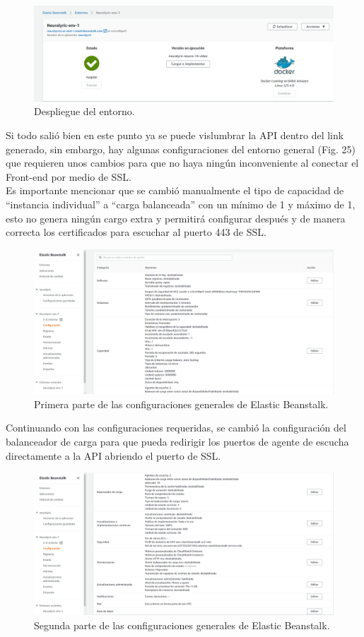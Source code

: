 \documentclass[12pt, a4paper, titlepage]{article}
\begin{document}
		\begin{figure}[H]
			\includegraphics[width=12cm]{./Imagenes/BackEnd/paso_5.png}
			\centering 
			\caption{Despliegue del entorno.}
		\end{figure}
		Si todo salió bien en este punto ya se puede vislumbrar la API dentro del link generado, sin embargo, hay algunas configuraciones del entorno general (Fig. 25) que requieren unos cambios para que no haya ningún inconveniente al conectar el Front-end por medio de SSL.\\
		Es importante mencionar que se cambió manualmente el tipo de capacidad de “instancia individual” a “carga balanceada” con un mínimo de 1 y máximo de 1, esto no genera ningún cargo extra y permitirá configurar después y de manera correcta los certificados para escuchar al puerto 443 de SSL.
		\begin{figure}[H]
			\includegraphics[width=12cm]{./Imagenes/BackEnd/config_1.png}
			\centering 
			\caption{Primera parte de las configuraciones generales de Elastic Beanstalk.}
		\end{figure}
		Continuando con las configuraciones requeridas, se cambió la configuración del balanceador de carga para que pueda redirigir los puertos de agente de escucha directamente a la API abriendo el puerto de SSL.
		\begin{figure}[H]
			\includegraphics[width=12cm]{./Imagenes/BackEnd/config_2.png}
			\centering 
			\caption{Segunda parte de las configuraciones generales de Elastic Beanstalk.}
		\end{figure}
\end{document}
